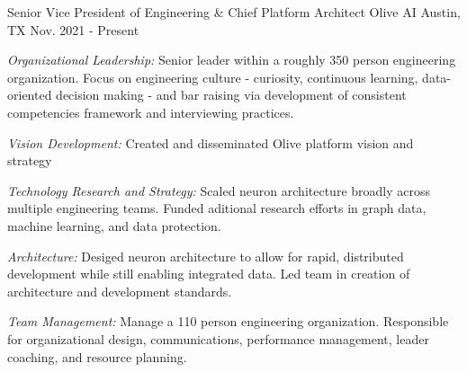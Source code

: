 \begin{cventries}


\cventry
{Senior Vice President of Engineering \& Chief Platform Architect}
{Olive AI}
{Austin, TX}
{Nov. 2021 - Present}
{
  \begin{cvitems}
    \item{\emph{Organizational Leadership:} Senior leader within a roughly 350 person engineering organization. Focus on engineering culture - curiosity, continuous learning, data-oriented decision making - and bar raising via development of consistent competencies framework and interviewing practices.}
    \item{\emph{Vision Development:} Created and disseminated Olive platform vision and strategy}
    \item{\emph{Technology Research and Strategy:} Scaled neuron architecture broadly across multiple engineering teams. Funded aditional research efforts in graph data, machine learning, and data protection. }
    \item{\emph{Architecture:} Desiged neuron architecture to allow for rapid, distributed development while still enabling integrated data. Led team in creation of architecture and development standards. }
    \item{\emph{Team Management:} Manage a 110 person engineering organization. Responsible for organizational design, communications, performance management, leader coaching, and resource planning.}
  \end{cvitems}
}



\end{cventries}
